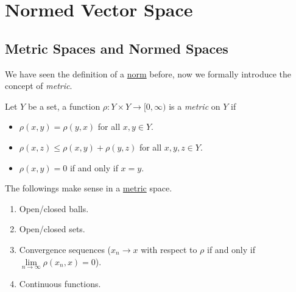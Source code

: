 \section{Normed Vector Space}
\subsection{Metric Spaces and Normed Spaces}
We have seen the definition of a \hyperref[def:norm]{norm} before, now we formally introduce the concept of \emph{metric}.
\begin{definition}[Metric]\label{def:metric}
	Let \(Y\) be a set, a function \(\rho \colon Y\times Y\to [0, \infty )\) is a \emph{metric} on \(Y\) if
	\begin{itemize}
		\item \(\rho (x, y) = \rho (y, x)\) for all \(x, y\in Y\).
		\item \(\rho (x, z) \leq \rho (x, y) + \rho (y, z)\) for all \(x, y, z\in Y\).
		\item \(\rho (x, y) = 0\) if and only if \(x = y\).
	\end{itemize}
\end{definition}

\begin{note}
	The followings make sense in a \hyperref[def:metric]{metric} space.
	\begin{enumerate}
		\item Open/closed balls.
		\item Open/closed sets.
		\item Convergence sequences (\(x_{n} \to x\) with respect to \(\rho \) if and only if \(\lim\limits_{n \to \infty} \rho (x_{n} , x) = 0\)).
		\item Continuous functions.
	\end{enumerate}
\end{note}

